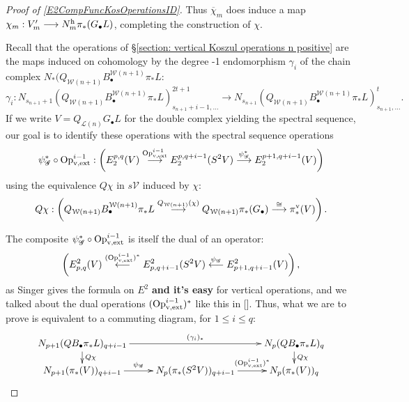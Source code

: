 \documentclass[11pt]{amsart}
\theoremstyle{plain}
\theoremstyle{definition}
\renewcommand{\to}{\longrightarrow}
\newcommand{\from}{\longleftarrow}
\newcommand{\scrQ}{\mathscr{Q}}
\newcommand{\scrR}{\mathscr{R}}
\newcommand{\scrT}{\mathscr{T}}
\newcommand{\scrY}{\mathscr{Y}}
\newcommand{\scrI}{\mathscr{I}}
\newcommand{\scrO}{\mathscr{O}}
\newcommand{\scrP}{\mathscr{P}}
\newcommand{\scrS}{\mathscr{S}}
\newcommand{\scrG}{\mathscr{G}}
\newcommand{\scrH}{\mathscr{H}}
\newcommand{\scrJ}{\mathscr{J}}
\newcommand{\scrK}{\mathscr{K}}
\newcommand{\scrL}{\mathscr{L}}
\newcommand{\scrZ}{\mathscr{Z}}
\newcommand{\scrN}{\mathscr{N}}
\newcommand{\scrM}{\mathscr{M}}
\newcommand{\calW}{\mathcal{W}}
\newcommand{\calL}{\mathcal{L}}
\newcommand{\calV}{\mathcal{V}}
\theoremstyle{plain}
\newcommand{\BSW}{{\scrG}}%
\newcommand{\vExtCohOp}{\textup{Op}_\textup{v,ext}}
\begin{document}
\begin{Composite functor spectral sequences}
\begin{proof}[Proof of \ref{E2CompFuncKosOperationsID}]
Thus $\overline{\chi}_m$ does induce a map $\chi_m:V'_m\to N_m^\textup{h}\pi_*(G_\bullet L)$, completing the construction of $\chi$.






Recall that the operations of \S\ref{section: vertical Koszul operations n positive} are the maps induced on cohomology by the degree -1 endomorphism $\gamma_i$ of the chain complex $N_*(Q_{\calW(n+1)} B^{\calW(n+1)}_{\bullet}\pi_*L$:
\[\gamma_i:N_{s_{n+1}+1}(Q_{\calW(n+1)} B^{\calW(n+1)}_{\bullet}\pi_*L)^{2t+1}_{s_{n+1}+i-1,\ldots}\to N_{s_{n+1}}(Q_{\calW(n+1)} B^{\calW(n+1)}_{\bullet}\pi_*L)^{t}_{s_{n+1},\ldots}.\]
If we write $V=Q_{\calL(n)}G_\bullet L$ for the double complex yielding the spectral sequence, our goal is to identify these operations with the spectral sequence operations
\[\psi_{\BSW}^*\circ\vExtCohOp^{i-1}:\left(E^{p,q}_2(V)\overset{\vExtCohOp^{i-1}}{\to} E^{p,q+i-1}_2(S^2V)\overset{\psi_{\BSW}^*}{\to}E^{p+1,q+i-1}_2(V)\right)\]
using the equivalence $Q\chi$ in $s\calV$ induced by $\chi$:%
\[Q\chi:\left(Q_{\calW(n+1)}B^{\calW(n+1)}_{\bullet}\pi_*L\overset{Q_{\calW(n+1)}(\chi)}{\to} Q_{\calW(n+1)}\pi_*(G_\bullet )\overset{\cong }{\to}\pi_*^\textup{v}(V)\right).\]

The composite $\psi_{\BSW}^*\circ\vExtCohOp^{i-1}$ is itself the dual of an operator:
\[\left(E_{p,q}^2(V)\overset{(\vExtCohOp^{i-1})^*}{\from} E_{p,q+i-1}^2(S^2V)\overset{\psi_{\BSW}}{\from}E_{p+1,q+i-1}^2(V)\right),\]
as Singer gives the formula on $E^2$ \textbf{and it's easy} for vertical operations, and we talked about the dual operations $(\vExtCohOp^{i-1})^*$ like this in []. Thus, what we are to prove is equivalent to a commuting diagram, for $1\leq i\leq q$:
\[\xymatrix@R=4mm{
N_{p+1}(QB_\bullet\pi_*L)_{q+i-1}\ar[rr]^-{(\gamma_i)_*}
\ar[d]^-{Q\chi}
&%
&%
N_p(QB_\bullet\pi_*L)_q\ar[d]^-{Q\chi}
\\%
N_{p+1}(\pi_*(V))_{q+i-1}\ar[r]^-{\psi_{\BSW}}
&%
N_{p}(\pi_*(S^2V))_{q+i-1}\ar[r]^-{(\vExtCohOp^{i-1})^*}
&%
N_p(\pi_*(V))_q%
}\]


\end{proof}
\end{Composite functor spectral sequences}
\end{document}
